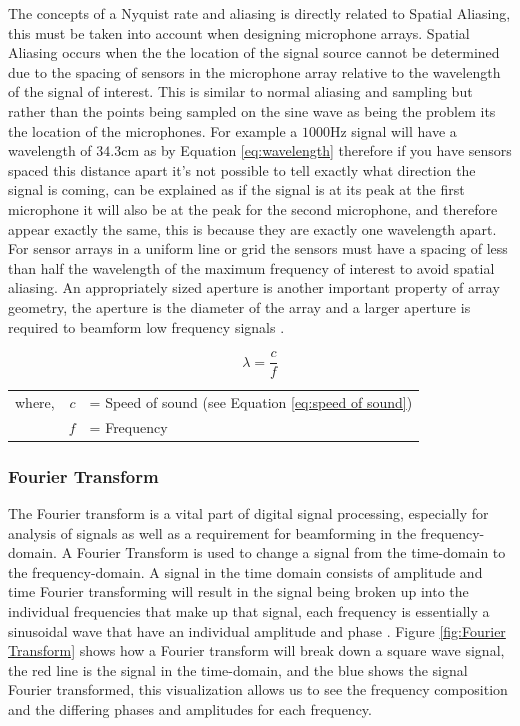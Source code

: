 \documentclass{UoNMCHA}
\numberwithin{equation}{section}
\begin{document}
    The concepts of a Nyquist rate and aliasing is directly related to Spatial Aliasing, this must be taken into account when designing microphone arrays. Spatial Aliasing occurs when the the location of the signal source cannot be determined due to the spacing of sensors in the microphone array relative to the wavelength of the signal of interest. This is similar to normal aliasing and sampling but rather than the points being sampled on the sine wave as being the problem its the location of the microphones. For example a $1000$Hz signal will have a wavelength of $34.3$cm as by Equation \ref{eq:wavelength} therefore if you have sensors spaced this distance apart it's not possible to tell exactly what direction the signal is coming, can be explained as if the signal is at its peak at the first microphone it will also be at the peak for the second microphone, and therefore appear exactly the same, this is because they are exactly one wavelength apart. For sensor arrays in a uniform line or grid the sensors must have a spacing of less than half the wavelength of the maximum frequency of interest to avoid spatial aliasing. An appropriately sized aperture is another important property of array geometry, the aperture is the diameter of the array and a larger aperture is required to beamform low frequency signals \citep{Ami08}.
	
	\begin{equation}
		\lambda = \frac{c}{f}
		\label{eq:wavelength}
	\end{equation}
	\begin{table}[H]
    \centering
        \begin{tabular}{lrl}
            where, & $c$ &= Speed of sound (see Equation \ref{eq:speed of sound}) \\
             & $f$ &= Frequency 
        \end{tabular}
    \end{table}
    
\subsubsection{Fourier Transform} \label{sec:Fourier Transform}

    The Fourier transform is a vital part of digital signal processing, especially for analysis of signals as well as a requirement for beamforming in the frequency-domain. A Fourier Transform is used to change a signal from the time-domain to the frequency-domain. A signal in the time domain consists of amplitude and time Fourier transforming will result in the signal being broken up into the individual frequencies that make up that signal, each frequency is essentially a sinusoidal wave that have an individual amplitude and phase \citep{Sch17}. Figure \ref{fig:Fourier Transform} shows how a Fourier transform will break down a square wave signal, the red line is the signal in the time-domain, and the blue shows the signal Fourier transformed, this visualization allows us to see the frequency composition and the differing phases and amplitudes for each frequency.
    
\end{document}
